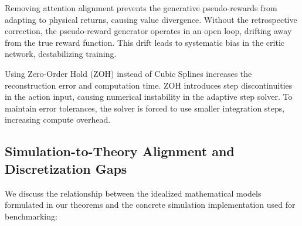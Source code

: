 \documentclass[manuscript, screen, review]{jair}
\begin{document}
Removing attention alignment prevents the generative pseudo-rewards from adapting to physical returns, causing value divergence. Without the retrospective correction, the pseudo-reward generator operates in an open loop, drifting away from the true reward function. This drift leads to systematic bias in the critic network, destabilizing training.

Using Zero-Order Hold (ZOH) instead of Cubic Splines increases the reconstruction error and computation time. ZOH introduces step discontinuities in the action input, causing numerical instability in the adaptive step solver. To maintain error tolerances, the solver is forced to use smaller integration steps, increasing compute overhead.


\subsection{Simulation-to-Theory Alignment and Discretization Gaps}
We discuss the relationship between the idealized mathematical models formulated in our theorems and the concrete simulation implementation used for benchmarking:
\end{document}
